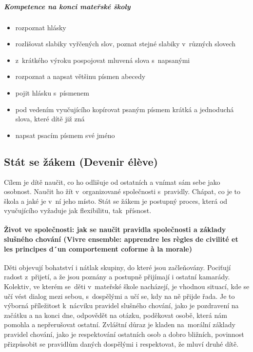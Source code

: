 					\subparagraph{Kompetence na konci mateřské školy}
					\begin{itemize}
					\item rozpoznat hlásky
					\item rozlišovat slabiky vyřčených slov, poznat stejné slabiky v různých slovech
					\item z krátkého výroku pospojovat mluvená slova s napsanými
					\item rozpoznat a napsat většinu písmen abecedy
					\item pojit hlásku s písmenem
					\item pod vedením vyučujícího kopírovat psaným písmem krátká a jednoduchá slova, které dítě již zná
					\item napsat psacím písmem své jméno
					\end{itemize}


		\subsection{Stát se žákem (Devenir élève)}
			Cílem je dítě naučit, co ho odlišuje od ostatních a vnímat sám sebe jako osobnost. Naučit ho žít v organizované společnosti s pravidly. Chápat, co je to škola a jaké je v ní jeho místo. Stát se žákem je postupný proces, která od vyučujícího vyžaduje jak flexibilitu, tak přísnost.
			\paragraph{Život ve společnosti: jak se naučit pravidla společnosti a základy slušného chování (Vivre ensemble: apprendre les règles de civilité et les principes d´un comportement coforme à la morale)}
				Děti objevují bohatství i nátlak skupiny, do které jsou začleňovány. Pociťují radost z přijetí, a že jsou poznány a postupně přijímají i ostatní kamarády. Kolektiv, ve kterém se děti v mateřské škole nacházejí, je vhodnou situací, kde se učí vést dialog mezi sebou, s dospělými a učí se, kdy na ně přijde řada. Je to výborná příležitost k nácviku pravidel slušného chování, jako je pozdravení na začátku a na konci dne, odpovědět na otázku, poděkovat osobě, která nám pomohla a nepřerušovat ostatní. Zvláštní důraz je kladen na morální základy pravidel chování, jako je respektování ostatních osob a dobro bližních, povinnost přizpůsobit se pravidlům daných dospělými i respektovat, že mluví druhé dítě. 

